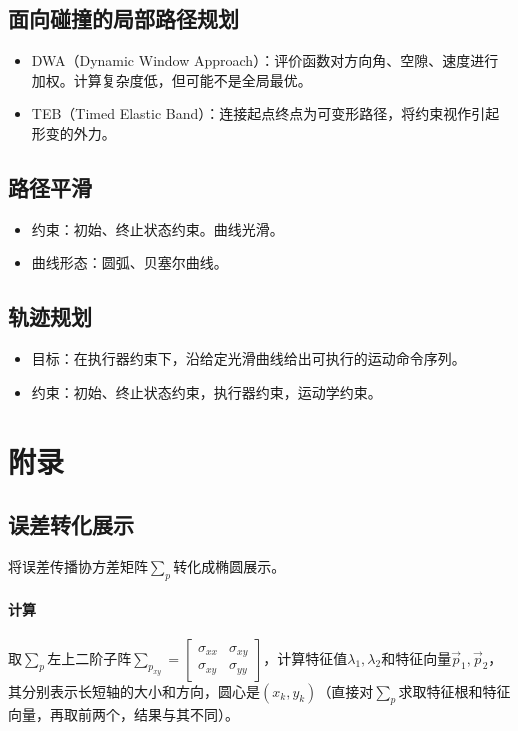 \documentclass[
12pt, %
a4paper, 
oneside, %
headinclude,footinclude, %
]{scrartcl}
\begin{document}
\subsection[面向碰撞的局部路径规划]{面向碰撞的局部路径规划}
\begin{itemize}
\item DWA（Dynamic Window Approach）：评价函数对方向角、空隙、速度进行加权。计算复杂度低，但可能不是全局最优。
\item TEB（Timed Elastic Band）：连接起点终点为可变形路径，将约束视作引起形变的外力。
\end{itemize}
\subsection[路径平滑]{路径平滑}
\begin{itemize}
\item 约束：初始、终止状态约束。曲线光滑。
\item 曲线形态：圆弧、贝塞尔曲线。
\end{itemize}
\subsection[轨迹规划]{轨迹规划}
\begin{itemize}
\item 目标：在执行器约束下，沿给定光滑曲线给出可执行的运动命令序列。
\item 约束：初始、终止状态约束，执行器约束，运动学约束。
\end{itemize}
\section{附录}
\subsection[误差转化展示]{误差转化展示}\label{sec:error}
将误差传播协方差矩阵$ \sum_p $转化成椭圆展示。
\paragraph{计算}
取$ \sum_p $左上二阶子阵$ \sum_{p_{xy}} = \begin{bmatrix} \sigma_{xx} & \sigma_{xy} \\ \sigma_{xy} & \sigma_{yy} \end{bmatrix} $，计算特征值$ \lambda_1, \lambda_2 $和特征向量$ \overrightarrow{p}_1, \overrightarrow{p}_2 $，其分别表示长短轴的大小和方向，圆心是$ (x_k, y_k) $（直接对$ \sum_p $求取特征根和特征向量，再取前两个，结果与其不同）。
\end{document}
